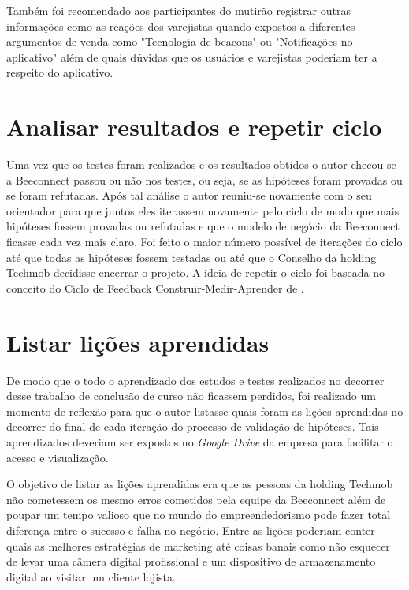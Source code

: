 Também foi recomendado aos participantes do mutirão registrar outras informações como as reações dos varejistas quando expostos a diferentes argumentos de venda como "Tecnologia de beacons" ou "Notificações no aplicativo" além de quais dúvidas que os usuários e varejistas poderiam ter a respeito do aplicativo.

\section{Analisar resultados e repetir ciclo}
\label{cha:analisar_resultados}
Uma vez que os testes foram realizados e os resultados obtidos o autor checou se a Beeconnect passou ou não nos testes, ou seja, se as hipóteses foram provadas ou se foram refutadas. 
Após tal análise o autor reuniu-se novamente com o seu orientador para que juntos eles iterassem novamente pelo ciclo de modo que mais hipóteses fossem provadas ou refutadas e que o modelo de negócio da Beeconnect ficasse cada vez mais claro. Foi feito o maior número possível de iterações do ciclo até que todas as hipóteses fossem testadas ou até que o Conselho da holding Techmob decidisse encerrar o projeto. A ideia de repetir o ciclo foi baseada no conceito do Ciclo de Feedback Construir-Medir-Aprender de .

\section{Listar lições aprendidas}
\label{cha:listar_licoes_aprendidas}
De modo que o todo o aprendizado dos estudos e testes realizados no decorrer desse trabalho de conclusão de curso não ficassem perdidos, foi realizado um momento de reflexão para que o autor listasse quais foram as lições aprendidas no decorrer do final de cada iteração do processo de validação de hipóteses. Tais aprendizados deveriam ser expostos no \textit{Google Drive} da empresa para facilitar o acesso e visualização.

O objetivo de listar as lições aprendidas era que as pessoas da holding Techmob não cometessem os mesmo erros cometidos pela equipe da Beeconnect além de poupar um tempo valioso que no mundo do empreendedorismo pode fazer total diferença entre o sucesso e falha no negócio. Entre as lições poderiam conter quais as melhores estratégias de marketing até coisas banais como não esquecer de levar uma câmera digital profissional e um dispositivo de armazenamento digital ao visitar um cliente lojista.